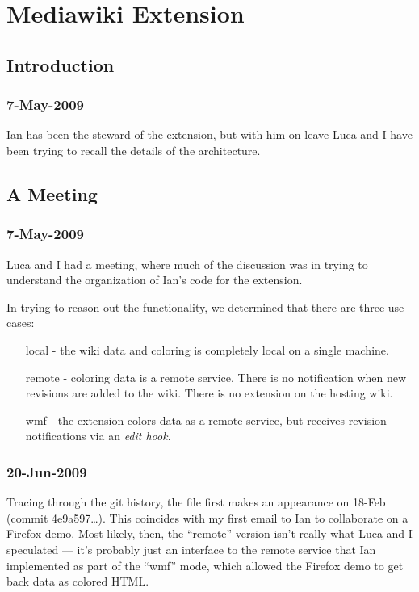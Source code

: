 \chapter{Mediawiki Extension}

\section{Introduction}

\subsection{7-May-2009}

Ian has been the steward of the 
extension, but with him on leave Luca and I have been
trying to recall the details of the architecture.

\section{A Meeting}

\subsection{7-May-2009}

Luca and I had a meeting, where much of the discussion was
in trying to understand the organization of Ian's code
for the extension.

In trying to reason out the functionality, we determined that
there are three use cases:
\begin{enumerate}
\item[local] - the wiki data and coloring is completely local on
	a single machine.
\item[remote] - coloring data is a remote service.
	There is no notification when new revisions are added to
	the wiki.  There is no extension on the hosting wiki.
\item[wmf] - the extension colors data as a remote service,
	but receives revision notifications via an \textit{edit hook}.
\end{enumerate}

\subsection{20-Jun-2009}

Tracing through the git history, the file 
first makes an appearance on 18-Feb (commit 4e9a597\ldots).
This coincides with my first email to Ian to collaborate on a Firefox demo.
Most likely, then, the ``remote'' version isn't really what Luca and
I speculated --- it's probably just an interface to the remote service
that Ian implemented as part of the ``wmf'' mode, which allowed the
Firefox demo to get back data as colored HTML.


